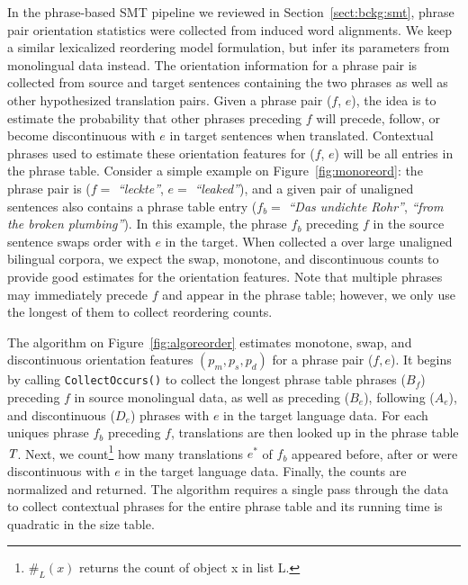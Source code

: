 \documentclass[11pt]{article}
\newcommand{\mnote}[1]{\marginpar{%
  \vskip-\baselineskip
  \raggedright\footnotesize
  \itshape\hrule\smallskip\tiny{#1}\par\smallskip\hrule}}
\newcommand{\mtodo}[1]{\mnote{\textcolor{red}{#1}}}
\newcommand{\secref}[1]{Section~\ref{#1}}
\newcommand{\figref}[1]{Figure~\ref{#1}}
\newcommand{\emq}[1]{\emph{``#1''}}
\begin{document}
In the phrase-based SMT pipeline we reviewed in \secref{sect:bckg:smt}, phrase pair orientation statistics were collected from induced word alignments.  We keep a similar lexicalized reordering model formulation, but infer its parameters from monolingual data instead.  The orientation information for a phrase pair is collected from source and target sentences containing the two phrases as well as other hypothesized translation pairs.  Given a phrase pair ($f$, $e$), the idea is to estimate the probability that other phrases preceding $f$ will precede, follow, or become discontinuous with $e$ in target sentences when translated.  Contextual phrases used to estimate these orientation features for ($f$, $e$) will be all entries in the phrase table.  Consider a simple example on \figref{fig:monoreord}: the phrase pair is ($f =$ \emq{leckte}, $e =$ \emq{leaked}), and a given pair of unaligned sentences also contains a phrase table entry ($f_{b} =$ \emq{Das undichte Rohr}, \emq{from the broken plumbing}).  In this example, the phrase $f_{b}$ preceding $f$ in the source sentence swaps order with $e$ in the target.  When collected a over large unaligned bilingual corpora, we expect the swap, monotone, and discontinuous counts to provide good estimates for the orientation features.  Note that multiple phrases may immediately precede $f$ and appear in the phrase table; however, we only use the longest of them to collect reordering counts.\mtodo{Explain why?}

The algorithm on \figref{fig:algoreorder} estimates monotone, swap, and discontinuous orientation features $(p_m, p_s, p_d)$ for a phrase pair ($f, e$).  It begins by calling {\tt \small CollectOccurs()} to collect the longest phrase table phrases ($B_f$) preceding $f$ in source monolingual data, as well as preceding ($B_e$), following ($A_e$), and discontinuous ($D_e$) phrases with $e$ in the target language data.  For each uniques phrase $f_{b}$ preceding $f$, translations are then looked up in the phrase table $\emph{T}$.  Next, we count\footnote{$\#_{L}(x)$ returns the count of object x in list L.} how many translations $e^*$ of $f_b$ appeared before, after or were discontinuous with $e$ in the target language data.  Finally, the counts are normalized and returned. \mtodo{Be more specific about the out-of-order counts?}  The algorithm requires a single pass through the data to collect contextual phrases for the entire phrase table and its running time is quadratic in the size table.\mtodo{Check}

\end{document}
